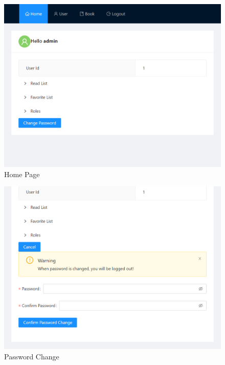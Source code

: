 \begin{minipage}{.49\textwidth}  
  \begin{figure}[H]
    \centering
    \includegraphics[width=\linewidth]{img/front-end/homepage.png}
    \caption{Home Page}
  \end{figure}
\end{minipage}
\begin{minipage}{.49\textwidth}
  \begin{figure}[H]
    \centering
    \includegraphics[width=\textwidth]{img/front-end/homepage-password.png}
    \caption{Password Change}
  \end{figure}
\end{minipage}

